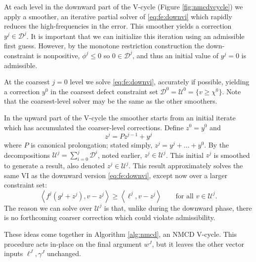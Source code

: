\documentclass[letterpaper,final,12pt,reqno]{amsart}
\theoremstyle{cstyle}
\theoremstyle{cstyle*}
\theoremstyle{dstyle}
\numberwithin{equation}{section}
\numberwithin{figure}{section}
\numberwithin{table}{section}
\numberwithin{theorem}{section}
\newcommand{\ip}[2]{\left<#1,#2\right>}
\begin{document}
At each level in the downward part of the V-cycle (Figure \ref{fig:nmcdvcycle}) we apply a smoother, an iterative partial solver of \eqref{eq:fe:downvi} which rapidly reduces the high-frequencies in the error.  This smoother yields a correction $y^j \in \mathcal{D}^j$.  It is important that we can initialize this iteration using an admissible first guess.  However, by the monotone restriction construction the down-constraint is nonpositive, $\phi^j\le 0$ so $0\in \mathcal{D}^j$, and thus an initial value of $y^j=0$ is admissible.

At the coarsest $j=0$ level we solve \eqref{eq:fe:downvi}, accurately if possible, yielding a correction $y^0$ in the coarsest defect constraint set $\mathcal{D}^0=\mathcal{U}^0 = \{v \ge \chi^0\}$.  Note that the coarsest-level solver may be the same as the other smoothers.

In the upward part of the V-cycle the smoother starts from an initial iterate which has accumulated the coarser-level corrections.  Define $z^0 = y^0$ and
\begin{equation}
z^j = P z^{j-1} + y^j  \label{eq:fe:upwardaccumulation}
\end{equation}
where $P$ is canonical prolongation; stated simply, $z^j = y^j + \dots + y^0$.  By the decompositions $\mathcal{U}^j = \sum_{i=0}^j \mathcal{D}^i$, noted earlier, $z^j \in \mathcal{U}^j$.  This initial $z^j$ is smoothed to generate a result, also denoted $z^j \in \mathcal{U}^j$.  This result approximately solves the same VI as the downward version \eqref{eq:fe:downvi}, except now over a larger constraint set:
\begin{equation}
\ip{f^j(g^j + z^j)}{v-z^j} \ge \ip{\ell^j}{v-z^j} \qquad \text{for all } v\in \mathcal{U}^j. \label{eq:fe:upvi}
\end{equation}
The reason we can solve over $\mathcal{U}^j$ is that, unlike during the downward phase, there is no forthcoming coarser correction which could violate admissibility.

These ideas come together in Algorithm \ref{alg:nmcd}, an NMCD V-cycle.  This procedure acts in-place on the final argument $w^J$, but it leaves the other vector inputs $\ell^J,\gamma^J$ unchanged.
\end{document}
